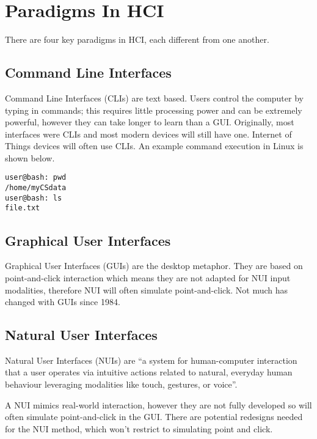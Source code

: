 \section{Paradigms In HCI}
There are four key paradigms in HCI, each different from one another.
\subsection{Command Line Interfaces}
Command Line Interfaces (CLIs) are text based. Users control the computer by typing in commands; this requires little processing power and can be extremely powerful, however they can take longer to learn than a GUI. Originally, most interfaces were CLIs and most modern devices will still have one. Internet of Things devices will often use CLIs. An example command execution in Linux is shown below.
\begin{verbatim}
user@bash: pwd
/home/myCSdata
user@bash: ls
file.txt
\end{verbatim}

\subsection{Graphical User Interfaces}
Graphical User Interfaces (GUIs) are the desktop metaphor. They are based on point-and-click interaction which means they are not adapted for NUI input modalities, therefore NUI will often simulate point-and-click. Not much has changed with GUIs since 1984. 

\subsection{Natural User Interfaces}
Natural User Interfaces (NUIs) are ``a system for human-computer interaction that a user operates via intuitive actions related to natural, everyday human behaviour leveraging modalities like touch, gestures, or voice''. 

A NUI mimics real-world interaction, however they are not fully developed so will often simulate point-and-click in the GUI. There are potential redesigns needed for the NUI method, which won't restrict to simulating point and click. 

